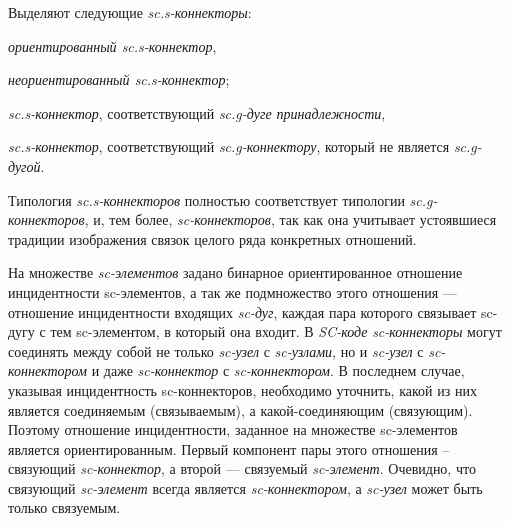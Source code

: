 \begin{SCn}
\end{SCn}

Выделяют следующие \textit{sc.s-коннекторы}:
\begin{textitemize}
	\item \textit{ориентированный \textit{sc.s-коннектор}},
	\item \textit{неориентированный \textit{sc.s-коннектор}};
	\item \textit{\textit{sc.s-коннектор}}, соответствующий \textit{sc.g-дуге принадлежности},
	\item \textit{\textit{sc.s-коннектор}}, соответствующий \textit{sc.g-коннектору}, который не является \textit{sc.g-дугой}.
\end{textitemize}

Типология \textit{sc.s-коннекторов} полностью соответствует типологии \textit{sc.g-коннекторов}, и, тем более, \textit{sc-коннекторов}, так как она учитывает устоявшиеся традиции изображения связок целого ряда конкретных отношений.

На множестве \textit{sc-элементов} задано бинарное ориентированное отношение инцидентности sc-элементов, а так же подмножество этого отношения --- отношение инцидентности входящих \textit{sc-дуг}, каждая пара которого связывает sc-дугу с тем sc-элементом, в который она входит. В \textit{SC-коде} \textit{sc-коннекторы} могут соединять между собой не только \textit{sc-узел} с \textit{sc-узлами}, но и \textit{sc-узел} с \textit{sc-коннектором} и даже \textit{sc-коннектор} с \textit{sc-коннектором}. В последнем случае, указывая инцидентность sc-коннекторов, необходимо уточнить, какой из них является соединяемым (связываемым), а какой-соединяющим (связующим). Поэтому отношение инцидентности, заданное на множестве sc-элементов является ориентированным. Первый компонент пары этого отношения – связующий \textit{sc-коннектор}, а второй --- связуемый \textit{sc-элемент}. Очевидно, что связующий \textit{sc-элемент} всегда является \textit{sc-коннектором}, а \textit{sc-узел} может быть только связуемым.

